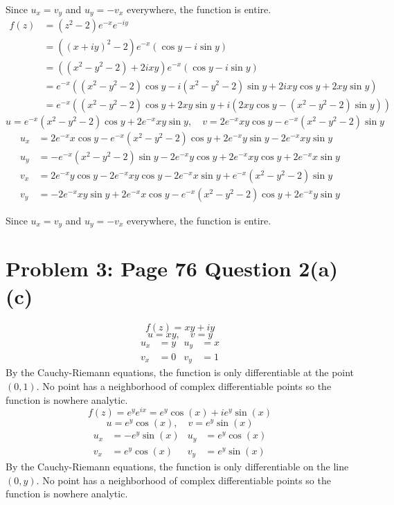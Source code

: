 \documentclass{article}
\begin{document}
Since $u_x = v_y$ and $u_y = -v_x$ everywhere,
the function is entire.
\begin{align*}
	f(z) &= (z^2 - 2)e^{-x}e^{-iy} \\
	&= ((x+iy)^2 - 2)e^{-x}(\cos y - i\sin y) \\
	&= ((x^2 - y^2 - 2) + 2ixy)e^{-x}(\cos y - i\sin y) \\
	&= e^{-x}((x^2-y^2-2)\cos y - i(x^2-y^2-2)\sin y + 2ixy\cos y +2xy\sin y) \\
	&= e^{-x}((x^2-y^2-2)\cos y + 2xy\sin y + i (2xy\cos y - (x^2-y^2-2)\sin y))
\end{align*}
\[
	u =  e^{-x}(x^2-y^2-2)\cos y + 2e^{-x}xy\sin y, \quad v = 2e^{-x}xy\cos y - e^{-x}(x^2-y^2-2)\sin y
\]
\begin{align*}
	u_x &= 2e^{-x}x\cos y - e^{-x}(x^2-y^2-2)\cos y + 2e^{-x}y\sin y - 2e^{-x}xy\sin y \\
	u_y &= -e^{-x}(x^2-y^2-2)\sin y -2e^{-x}y\cos y + 2e^{-x}xy\cos y + 2e^{-x}x\sin y\\
	v_x &= 2e^{-x}y\cos y - 2e^{-x}xy\cos y - 2e^{-x}x\sin y + e^{-x}(x^2-y^2-2)\sin y\\
	v_y &= -2e^{-x}xy\sin y + 2e^{-x}x\cos y - e^{-x}(x^2-y^2-2)\cos y + 2e^{-x}y\sin y
\end{align*}

Since $u_x = v_y$ and $u_y = -v_x$ everywhere,
the function is entire.
\newpage
\section*{Problem 3: Page 76 Question 2(a)(c)}
\[
	f(z) = xy + iy
\]
\[
	u = xy, \quad v = y
\]
\begin{equation*}
	\begin{aligned}
		u_x &= y & u_y &= x \\
		v_x &= 0 & v_y &= 1
	\end{aligned}
\end{equation*}
By the Cauchy-Riemann equations, the function is only differentiable at 
the point $(0,1)$.
No point has a neighborhood of complex differentiable points so 
the function is nowhere analytic.
\[
	f(z) = e^ye^{ix} = e^y\cos(x) + ie^y\sin(x) 
\]
\[
	u = e^y\cos(x), \quad v = e^y\sin(x) 
\]
\begin{equation*}
	\begin{aligned}
		u_x &= -e^y\sin(x) & u_y &= e^y\cos(x) \\
		v_x &= e^y\cos(x)  & v_y &= e^y\sin(x) 
	\end{aligned}
\end{equation*}
By the Cauchy-Riemann equations, the function is only differentiable on 
the line $(0, y)$.
No point has a neighborhood of complex differentiable points so 
the function is nowhere analytic.
\newpage
\end{document}
